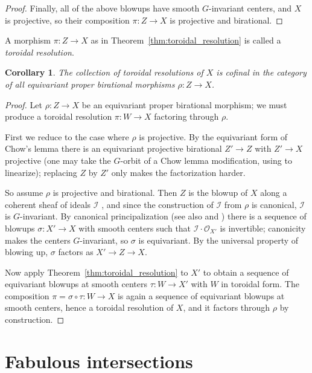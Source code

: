 \documentclass[11pt]{amsart}
\theoremstyle{plain}
\newtheorem{corollary}[theorem]{Corollary}
\theoremstyle{definition}
\theoremstyle{remark}
\numberwithin{equation}{section}
\begin{document}
\begin{proof}
Finally, all of the above blowups have smooth $G$-invariant centers, and $X$
is projective, so their composition $\pi : Z \to X$ is projective and
birational.
\end{proof}

A morphism $\pi : Z \to X$ as in Theorem~\ref{thm:toroidal_resolution}
is called a \emph{toroidal resolution}.

\begin{corollary} \label{cor:cofinal}
The collection of toroidal resolutions of $X$ is cofinal in the category
of all equivariant proper birational morphisms $\rho : Z \to X$.
\end{corollary}

\begin{proof}
Let $\rho : Z \to X$ be an equivariant proper birational morphism; we must
produce a toroidal resolution $\pi : W \to X$ factoring through $\rho$.

First we reduce to the case where $\rho$ is projective.  By the equivariant
form of Chow's lemma there is an equivariant projective birational
$Z' \to Z$ with $Z' \to X$ projective (one may take the $G$-orbit of a
Chow lemma modification, using \cite{Sumihiro} to linearize); replacing $Z$
by $Z'$ only makes the factorization harder.

So assume $\rho$ is projective and birational.  Then $Z$ is the blowup of $X$
along a coherent sheaf of ideals $\mathcal{I}$
\cite[Theorem~II.7.17]{Hartshorne}, and since the construction of
$\mathcal{I}$ from $\rho$ is canonical, $\mathcal{I}$ is $G$-invariant.  By
canonical principalization \cite[Theorem~1.10]{BierstoneMilman} (see also
\cite{Wlodarczyk} and \cite[Theorem~3.26]{Kollar}) there is a sequence of
blowups $\sigma : X' \to X$ with smooth centers such that
$\mathcal{I} \cdot \mathcal{O}_{X'}$ is invertible; canonicity makes the
centers $G$-invariant, so $\sigma$ is equivariant.  By the universal
property of blowing up, $\sigma$ factors as $X' \to Z \to X$.

Now apply Theorem~\ref{thm:toroidal_resolution} to $X'$ to obtain a sequence
of equivariant blowups at smooth centers $\tau : W \to X'$ with $W$ in
toroidal form.  The composition $\pi = \sigma \circ \tau : W \to X$ is again
a sequence of equivariant blowups at smooth centers, hence a toroidal
resolution of $X$, and it factors through $\rho$ by construction.
\end{proof}

\section{Fabulous intersections}
\end{document}
